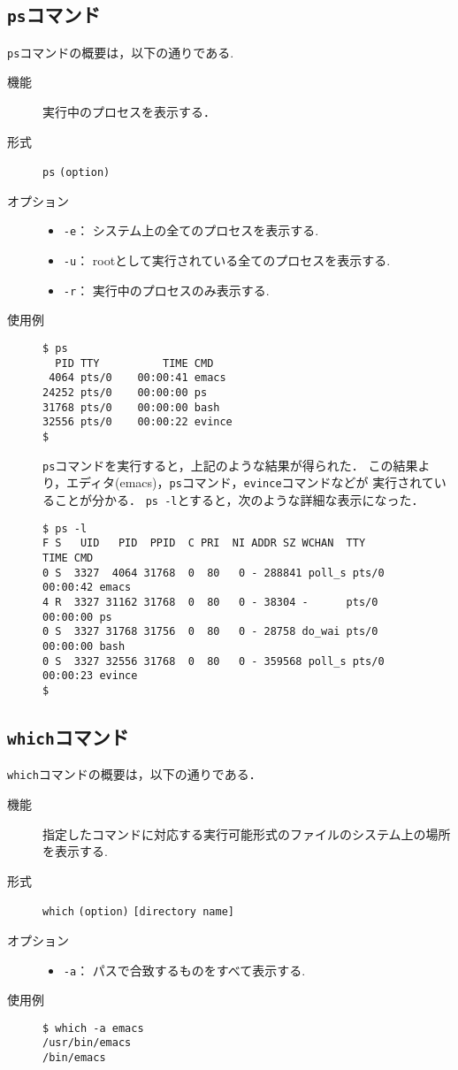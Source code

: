 \documentclass[a4j,11pt]{jarticle}
\begin{document}
\subsection{\texttt{ps}コマンド}
\verb|ps|コマンドの概要は，以下の通りである.
\begin{description}
  \item[機能]
    実行中のプロセスを表示する．
  \item[形式]
    \verb|ps| \verb|(option)|
  \item[オプション]
    \begin{itemize}
      \item \verb|-e|：  システム上の全てのプロセスを表示する.
      \item \verb|-u|：  rootとして実行されている全てのプロセスを表示する.
      \item \verb|-r|：  実行中のプロセスのみ表示する.
    \end{itemize}
  \item[使用例]
    \begin{verbatim}
$ ps
  PID TTY          TIME CMD
 4064 pts/0    00:00:41 emacs
24252 pts/0    00:00:00 ps
31768 pts/0    00:00:00 bash
32556 pts/0    00:00:22 evince
$ 
    \end{verbatim}
\verb|ps|コマンドを実行すると，上記のような結果が得られた．
この結果より，エディタ(emacs)，\verb|ps|コマンド，\verb|evince|コマンドなどが
実行されていることが分かる．
\verb|ps -l|とすると，次のような詳細な表示になった．
\begin{verbatim}
$ ps -l
F S   UID   PID  PPID  C PRI  NI ADDR SZ WCHAN  TTY          TIME CMD
0 S  3327  4064 31768  0  80   0 - 288841 poll_s pts/0   00:00:42 emacs
4 R  3327 31162 31768  0  80   0 - 38304 -      pts/0    00:00:00 ps
0 S  3327 31768 31756  0  80   0 - 28758 do_wai pts/0    00:00:00 bash
0 S  3327 32556 31768  0  80   0 - 359568 poll_s pts/0   00:00:23 evince
$ 
\end{verbatim}
\end{description}

\subsection{\texttt{which}コマンド}
\verb|which|コマンドの概要は，以下の通りである．
\begin{description}
  \item[機能]
    指定したコマンドに対応する実行可能形式のファイルのシステム上の場所を表示する.
  \item[形式]
    \verb|which| \verb|(option)| \verb|[directory name]|
  \item[オプション]
    \begin{itemize}
      \item \verb|-a|：  パスで合致するものをすべて表示する.
    \end{itemize}
  \item[使用例]
    \begin{verbatim}
$ which -a emacs
/usr/bin/emacs
/bin/emacs
    \end{verbatim}
\end{description}
\end{document}
